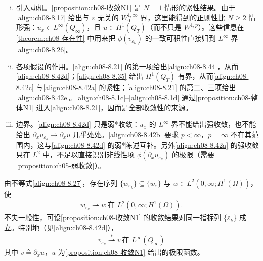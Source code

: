 \documentclass[../../main.tex]{subfiles}%
\begin{document}
\begin{remark}\label{remark:ch08-收敛N1动机}
\begin{enumerate}[(i)]
\item 引入动机。\cref{proposition:ch08-收敛N1} 是 $N=1$ 情形的紧性结果。由于\eqref{align:ch08-8.17} 给出与 $\varepsilon$ 无关的 $W^{1,\infty}_0$ 界，这里能得到的正则性比 $N\geqslant2$ 情形强：$u_x\in L^\infty(Q_\infty)$，且 $u\in H^1(Q_T)$（而不只是 $W^{1,p}$）。这些信息在\cref{theorem:ch08-存在性} 中用来把 $\phi(v_{\varepsilon_k})$ 的一致可积性直接归到 $L^\infty$ 界\eqref{align:ch08-8.26}。
\item 各项假设的作用。\eqref{align:ch08-8.21} 的第一项给出\eqref{align:ch08-8.44}，从而\eqref{align:ch08-8.42d}；\eqref{align:ch08-8.35} 给出 $H^1(Q_T)$ 有界，从而\eqref{align:ch08-8.42c} 与\eqref{align:ch08-8.42a} 的紧性；\eqref{align:ch08-8.21} 的第二、三项给出\eqref{align:ch08-8.42e}。\eqref{align:ch08-8.1c}--\eqref{align:ch08-8.1d} 通过\cref{proposition:ch08-整体N1} 进入\eqref{align:ch08-8.21}，因而是全部收敛性的来源。
\item 边界。\eqref{align:ch08-8.42d} 只是弱*收敛：$u_x$ 的 $L^\infty$ 界不能给出强收敛，也不能给出 $\partial_xu_{\varepsilon_k}\to\partial_xu$ 几乎处处。\eqref{align:ch08-8.42b} 要求 $p<\infty$，$p=\infty$ 不在其范围内，这与\eqref{align:ch08-8.42d} 的弱*陈述互补。另外\eqref{align:ch08-8.42a} 的强收敛只在 $L^2$ 中，不足以直接识别非线性项 $\phi(\partial_xu_{\varepsilon_k})$ 的极限（需要\cref{proposition:ch05-弱收敛}）。
\end{enumerate}
\end{remark}

\begin{remark}\label{remark:ch08-w收敛}
由不等式\eqref{align:ch08-8.27}，存在序列 $\{w_{\varepsilon_k}\}\subseteq\{w_\varepsilon\}$ 与 $w\in L^2(0,\infty;H^1(\Omega))$，使
\begin{align}
w_{\varepsilon_k}\rightharpoonup w\ \text{在 }L^2(0,\infty;H^1(\Omega)). \label{align:ch08-8.45}
\end{align}
不失一般性，可设\cref{proposition:ch08-收敛N1} 的收敛结果对同一指标列 $\{\varepsilon_k\}$ 成立。特别地（见\eqref{align:ch08-8.42d}），
\begin{align}
v_{\varepsilon_k}\stackrel{*}{\rightharpoonup}v\ \text{在 }L^\infty(Q_\infty) \label{align:ch08-8.46}
\end{align}
其中 $v\triangleq \partial_x u$，$u$ 为\cref{proposition:ch08-收敛N1} 给出的极限函数。
\end{remark}
\end{document}

